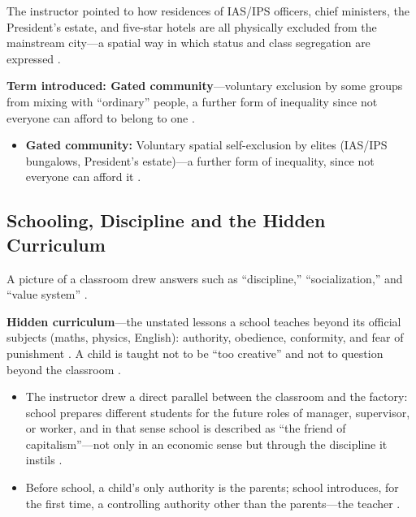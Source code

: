 \begin{KeyConcept}
The instructor pointed to how residences of IAS/IPS officers, chief ministers, the President's estate, and five-star hotels are all physically excluded from the mainstream city---a spatial way in which status and class segregation are expressed .

\textbf{Term introduced: Gated community}---voluntary exclusion by some groups from mixing with ``ordinary'' people, a further form of inequality since not everyone can afford to belong to one .
\end{KeyConcept}

\begin{QuickRevision}
\begin{itemize}
    \item \textbf{Gated community:} Voluntary spatial self-exclusion by elites (IAS/IPS bungalows, President's estate)---a further form of inequality, since not everyone can afford it .
\end{itemize}
\end{QuickRevision}

\subsection{Schooling, Discipline and the Hidden Curriculum}
A picture of a classroom drew answers such as ``discipline,'' ``socialization,'' and ``value system'' .

\begin{KeyConcept}
\textbf{Hidden curriculum}---the unstated lessons a school teaches beyond its official subjects (maths, physics, English): authority, obedience, conformity, and fear of punishment . A child is taught not to be ``too creative'' and not to question beyond the classroom .
\begin{itemize}
    \item The instructor drew a direct parallel between the classroom and the factory: school prepares different students for the future roles of manager, supervisor, or worker, and in that sense school is described as ``the friend of capitalism''---not only in an economic sense but through the discipline it instils .
    \item Before school, a child's only authority is the parents; school introduces, for the first time, a controlling authority other than the parents---the teacher .
\end{itemize}
\end{KeyConcept}

